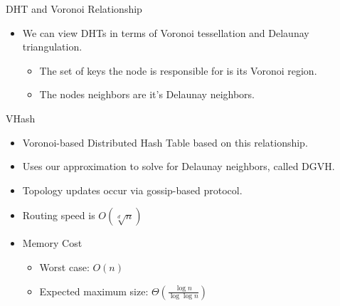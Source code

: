 \documentclass[11pt]{beamer}
\begin{document}


\begin{frame}{DHT and Voronoi Relationship }
	\begin{itemize}
		\item We can view DHTs in terms of Voronoi tessellation and Delaunay triangulation.
		\begin{itemize}
			\item The set of keys the node is responsible for is its Voronoi region.
			\item The nodes neighbors are it's Delaunay neighbors.
		\end{itemize}
	\end{itemize}
\end{frame}

\begin{frame}{VHash}
	\begin{itemize}
		\item Voronoi-based Distributed Hash Table based on this relationship.
		\item Uses our approximation to solve for Delaunay neighbors, called DGVH.
		\item Topology updates occur via  gossip-based protocol. 
		\item Routing speed is $ O(\sqrt[d]{n} ) $
		\item Memory Cost
		\begin{itemize}
			\item Worst case: $O(n)$
			\item Expected maximum size: $\Theta(\frac{\log n}{\log \log n} )$
		\end{itemize}
	\end{itemize}
\end{frame}
\end{document}
